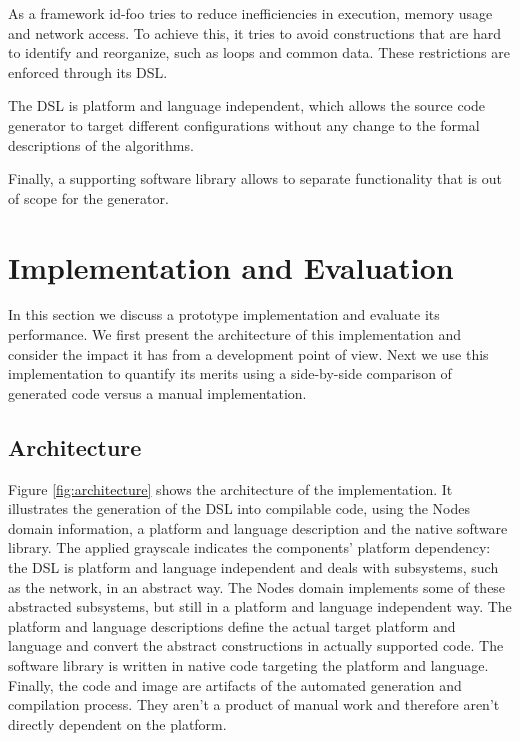 \documentclass[conference]{IEEEtran}
\newcommand{\NAME}{id-foo\xspace}
\begin{document}
As a framework \NAME tries to reduce inefficiencies in execution, memory usage
and network access. To achieve this, it tries to avoid constructions that are
hard to identify and reorganize, such as loops and common data. These
restrictions are enforced through its DSL.

The DSL is platform and language independent, which allows the source code
generator to target different configurations without any change to the formal
descriptions of the algorithms.

Finally, a supporting software library allows to separate functionality that is
out of scope for the generator.

\section{Implementation and Evaluation}
\label{evaluation}

In this section we discuss a prototype implementation and evaluate its
performance. We first present the architecture of this implementation and
consider the impact it has from a development point of view. Next we use this
implementation to quantify its merits using a side-by-side comparison of
generated code versus a manual implementation.

\subsection*{Architecture}

Figure \ref{fig:architecture} shows the architecture of the implementation. It
illustrates the generation of the DSL into compilable code, using the Nodes
domain information, a platform and language description and the native software
library. The applied grayscale indicates the components' platform dependency:
the DSL is platform and language independent and deals with subsystems, such as
the network, in an abstract way. The Nodes domain implements some of these
abstracted subsystems, but still in a platform and language independent way.
The platform and language descriptions define the actual target platform and
language and convert the abstract constructions in actually supported code. The
software library is written in native code targeting the platform and language.
Finally, the code and image are artifacts of the automated generation and
compilation process. They aren't a product of manual work and therefore aren't
directly dependent on the platform.
\end{document}
